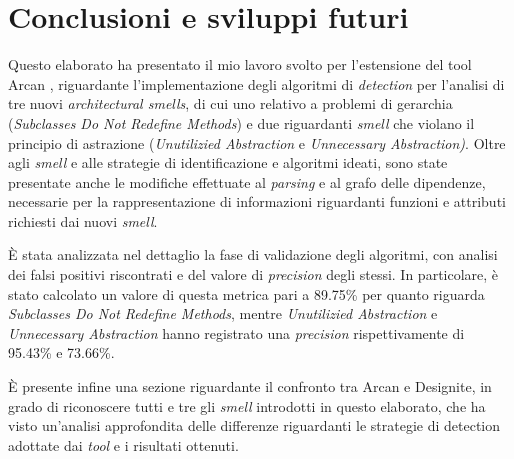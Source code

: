 \section{Conclusioni e sviluppi futuri}
Questo elaborato ha presentato il mio lavoro svolto per l'estensione del tool Arcan \cite{Arcan2017}, riguardante l'implementazione degli algoritmi di \textit{detection} per l'analisi di tre nuovi \textit{architectural smells}, di cui uno relativo a problemi di gerarchia (\textit{Subclasses Do Not Redefine Methods}) e due riguardanti \textit{smell} che violano il principio di astrazione (\textit{Unutilizied Abstraction} e \textit{Unnecessary Abstraction)}. Oltre agli \textit{smell} e alle strategie di identificazione e algoritmi ideati, sono state presentate anche le modifiche effettuate al \textit{parsing} e al grafo delle dipendenze, necessarie per la rappresentazione di informazioni riguardanti funzioni e attributi richiesti dai nuovi \textit{smell}.
    
È stata analizzata nel dettaglio la fase di validazione degli algoritmi, con analisi dei falsi positivi riscontrati e del valore di \textit{precision} degli stessi. 
In particolare, è stato calcolato un valore di questa metrica pari a 89.75\% per quanto riguarda \textit{Subclasses Do Not Redefine Methods}, mentre \textit{Unutilizied Abstraction} e \textit{Unnecessary Abstraction} hanno registrato una \textit{precision} rispettivamente di 95.43\% e 73.66\%.

È presente infine una sezione riguardante il confronto tra Arcan e Designite, 
in grado di riconoscere tutti e tre gli \textit{smell} introdotti in questo elaborato, che ha visto un'analisi approfondita delle differenze riguardanti le strategie di detection adottate dai \textit{tool} e i risultati ottenuti.

